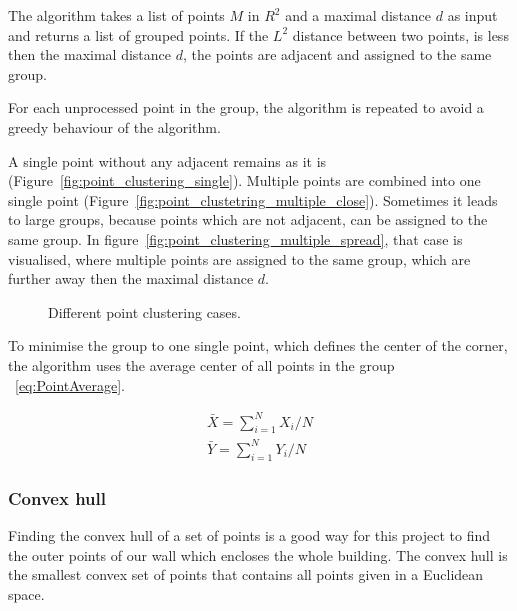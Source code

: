 The algorithm takes a list of points $M$ in $R^2$ and a maximal distance $d$ as input and returns a list of grouped points. If the $L^2$ distance between two points, is less then the maximal distance $d$, the points are adjacent and assigned to the same group.

For each unprocessed point in the group, the algorithm is repeated to avoid a greedy behaviour of the algorithm.

A single point without any adjacent remains as it is (Figure~\ref{fig:point_clustering_single}). Multiple points are combined into one single point (Figure~\ref{fig:point_clustetring_multiple_close}). Sometimes it leads to large groups, because points which are not adjacent, can be assigned to the same group. In figure~\ref{fig:point_clustering_multiple_spread}, that case is visualised, where multiple points are assigned to the same group, which are further away then the maximal distance $d$.

\begin{figure}[h!]
	\centering
	\hfill
	\hfill
	\caption{Different point clustering cases.}
	\label{fig:PointClusteringCases}
\end{figure}

To minimise the group to one single point, which defines the center of the corner, the algorithm uses the average center of all points in the group ~\eqref{eq:PointAverage}.


\begin{equation} \label{eq:PointAverage}
\begin{gathered}
\bar{X} = \sum_{i=1}^{N}X_{i}/N
\\
\bar{Y} = \sum_{i=1}^{N}Y_{i}/N
\end{gathered}
\end{equation}


\subsubsection{Convex hull}
\label{sub:ConvexHull}
Finding the convex hull of a set of points is a good way for this project to find the outer points of our wall which encloses the whole building. The convex hull is the smallest convex set of points that contains all points given in a Euclidean space.

